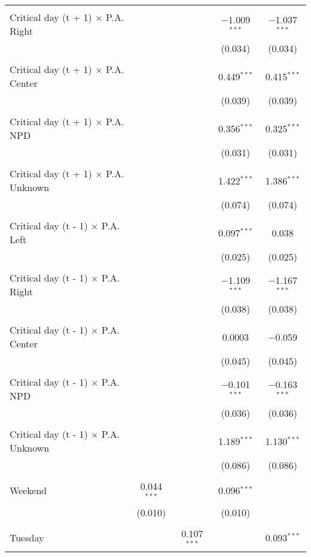 \documentclass[
]{article}
\begin{document}
\begin{table}[!htbp]
{\begin{tabular}{@{\extracolsep{5pt}}lcccc}
  & & & & \\ 
 Critical day (t + 1) $\times$ P.A. Right &  &  & $-$1.009$^{***}$ & $-$1.037$^{***}$ \\ 
  &  &  & (0.034) & (0.034) \\ 
  & & & & \\ 
 Critical day (t + 1) $\times$ P.A. Center &  &  & 0.449$^{***}$ & 0.415$^{***}$ \\ 
  &  &  & (0.039) & (0.039) \\ 
  & & & & \\ 
 Critical day (t + 1) $\times$ P.A. NPD &  &  & 0.356$^{***}$ & 0.325$^{***}$ \\ 
  &  &  & (0.031) & (0.031) \\ 
  & & & & \\ 
 Critical day (t + 1) $\times$ P.A. Unknown &  &  & 1.422$^{***}$ & 1.386$^{***}$ \\ 
  &  &  & (0.074) & (0.074) \\ 
  & & & & \\ 
 Critical day (t - 1) $\times$ P.A. Left &  &  & 0.097$^{***}$ & 0.038 \\ 
  &  &  & (0.025) & (0.025) \\ 
  & & & & \\ 
 Critical day (t - 1) $\times$ P.A. Right &  &  & $-$1.109$^{***}$ & $-$1.167$^{***}$ \\ 
  &  &  & (0.038) & (0.038) \\ 
  & & & & \\ 
 Critical day (t - 1) $\times$ P.A. Center &  &  & 0.0003 & $-$0.059 \\ 
  &  &  & (0.045) & (0.045) \\ 
  & & & & \\ 
 Critical day (t - 1) $\times$ P.A. NPD &  &  & $-$0.101$^{***}$ & $-$0.163$^{***}$ \\ 
  &  &  & (0.036) & (0.036) \\ 
  & & & & \\ 
 Critical day (t - 1) $\times$ P.A. Unknown &  &  & 1.189$^{***}$ & 1.130$^{***}$ \\ 
  &  &  & (0.086) & (0.086) \\ 
  & & & & \\ 
 Weekend & 0.044$^{***}$ &  & 0.096$^{***}$ &  \\ 
  & (0.010) &  & (0.010) &  \\ 
  & & & & \\ 
 Tuesday &  & 0.107$^{***}$ &  & 0.093$^{***}$ \\ 

\end{tabular}}
\end{table}
\end{document}
